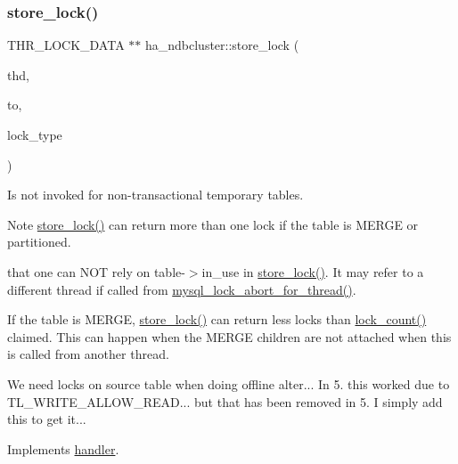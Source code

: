 \mbox{\label{classha__ndbcluster_a5bc14d2819ddbc2d616e11db49d669de}} 
\subsubsection{\texorpdfstring{store\+\_\+lock()}{store\_lock()}}
{\footnotesize\ttfamily T\+H\+R\+\_\+\+L\+O\+C\+K\+\_\+\+D\+A\+TA $\ast$$\ast$ ha\+\_\+ndbcluster\+::store\+\_\+lock (\begin{DoxyParamCaption}\item[{T\+HD $\ast$}]{thd,  }\item[{T\+H\+R\+\_\+\+L\+O\+C\+K\+\_\+\+D\+A\+TA $\ast$$\ast$}]{to,  }\item[{enum thr\+\_\+lock\+\_\+type}]{lock\+\_\+type }\end{DoxyParamCaption})\hspace{0.3cm}{\ttfamily [virtual]}}

Is not invoked for non-\/transactional temporary tables.

\begin{DoxyNote}{Note}
\mbox{\hyperlink{classha__ndbcluster_a5bc14d2819ddbc2d616e11db49d669de}{store\+\_\+lock()}} can return more than one lock if the table is M\+E\+R\+GE or partitioned.

that one can N\+OT rely on table-\/$>$in\+\_\+use in \mbox{\hyperlink{classha__ndbcluster_a5bc14d2819ddbc2d616e11db49d669de}{store\+\_\+lock()}}. It may refer to a different thread if called from \mbox{\hyperlink{group__Locking_gad2320fa808c9d6523790e796d57e2331}{mysql\+\_\+lock\+\_\+abort\+\_\+for\+\_\+thread()}}.

If the table is M\+E\+R\+GE, \mbox{\hyperlink{classha__ndbcluster_a5bc14d2819ddbc2d616e11db49d669de}{store\+\_\+lock()}} can return less locks than \mbox{\hyperlink{classhandler_a2447668275a831bcf73b5c00818254a6}{lock\+\_\+count()}} claimed. This can happen when the M\+E\+R\+GE children are not attached when this is called from another thread. 
\end{DoxyNote}
We need locks on source table when doing offline alter... In 5. this worked due to T\+L\+\_\+\+W\+R\+I\+T\+E\+\_\+\+A\+L\+L\+O\+W\+\_\+\+R\+E\+AD... but that has been removed in 5. I simply add this to get it...

Implements \mbox{\hyperlink{classhandler_a2502e460566f2c4b506cc1b30eb79e0a}{handler}}.

